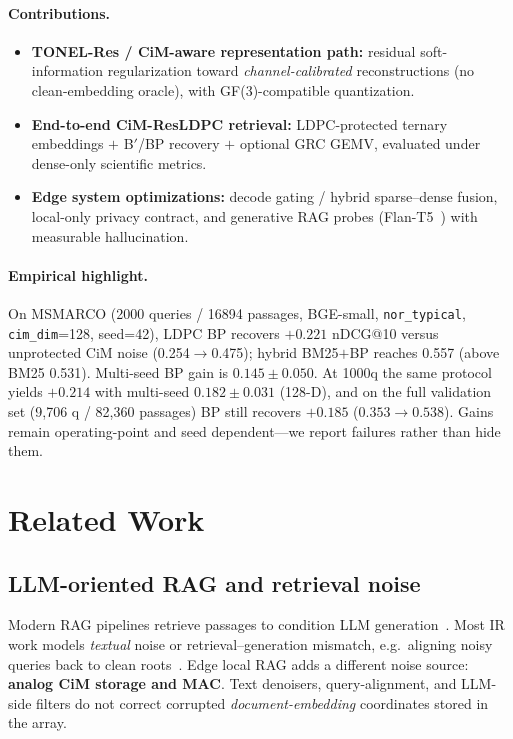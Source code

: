 \documentclass[sigconf,review,anonymous]{acmart}
\begin{document}
\paragraph{Contributions.}
\begin{itemize}
  \item \textbf{TONEL-Res / CiM-aware representation path:} residual soft-information regularization toward \emph{channel-calibrated} reconstructions (no clean-embedding oracle), with GF(3)-compatible quantization.
  \item \textbf{End-to-end CiM-ResLDPC retrieval:} LDPC-protected ternary embeddings $+$ B$'$/BP recovery $+$ optional GRC GEMV, evaluated under dense-only scientific metrics.
  \item \textbf{Edge system optimizations:} decode gating / hybrid sparse--dense fusion, local-only privacy contract, and generative RAG probes (Flan-T5~\cite{raffel2020t5}) with measurable hallucination.
\end{itemize}

\paragraph{Empirical highlight.}
On MSMARCO (2000 queries / 16894 passages, BGE-small, \texttt{nor\_typical}, \texttt{cim\_dim}=128, seed=42), LDPC BP recovers $+0.221$ nDCG@10 versus unprotected CiM noise (0.254$\rightarrow$0.475); hybrid BM25$+$BP reaches 0.557 (above BM25 0.531).
Multi-seed BP gain is $0.145\pm0.050$.
At 1000q the same protocol yields $+0.214$ with multi-seed $0.182\pm0.031$ (128-D), and on the full validation set (9{,}706 q / 82{,}360 passages) BP still recovers $+0.185$ ($0.353\rightarrow0.538$).
Gains remain operating-point and seed dependent---we report failures rather than hide them.

\section{Related Work}

\subsection{LLM-oriented RAG and retrieval noise}
Modern RAG pipelines retrieve passages to condition LLM generation~\cite{lewis2020rag,guu2020realm}.
Most IR work models \emph{textual} noise or retrieval--generation mismatch, e.g.\ aligning noisy queries back to clean roots~\cite{campos2023capot}.
Edge local RAG adds a different noise source: \textbf{analog CiM storage and MAC}.
Text denoisers, query-alignment, and LLM-side filters do not correct corrupted \emph{document-embedding} coordinates stored in the array.
\end{document}
